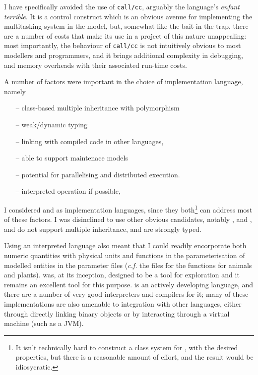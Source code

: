 I have specifically avoided the use of \texttt{call/cc}, arguably the
language's \emph{enfant terrible}. It is a control construct which is
an obvious avenue for implementing the multitasking system in the
model, but, somewhat like the bait in the trap, there are a number of
costs that make its use in a project of this nature unappealing: most
importantly, the behaviour of \texttt{call/cc} is not intuitively
obvious to most modellers and programmers, and it brings additional
complexity in debugging, and memory overheads with their associated
run-time costs.

A number of factors were important in the choice of implementation
language, namely
\begin{itemize}
\item[--] class-based multiple inheritance with polymorphism\\
\item[--] weak/dynamic typing\\
\item[--] linking with compiled code in other languages,\\
\item[--] able to support maintenace models\\
\item[--] potential for parallelising and distributed execution.
\item[--] interpreted operation if possible,
\end{itemize}

I considered \Cpp and \CC as implementation languages, since they
both\footnote{It isn't technically hard to construct a class system
for \CC, with the desired properties, but there is a reasonable amount
of effort, and the result would be idiosycratic.} can address most of
these factors. I was disinclined to use other obvious candidates,
notably \Java, and \Csharp, and \DD do not support multiple
inheritance, and are strongly typed.

Using an interpreted language also meant that I could readily
encorporate both numeric quantities with physical units and functions
in the parameterisation of modelled entities in the parameter files
(\emph{c.f.}  the files for the
 functions for animals and plants). \Scheme was,
at its inception, designed to be a tool for exploration
\cite{sussman1998first} and it remains an excellent tool for this
purpose. \Scheme is an actively developing language, and there are a
number of very good interpreters and compilers for it; many of these
implementations are also amenable to integration with other languages,
either through directly linking binary objects or by interacting
through a virtual machine (such as a JVM).


